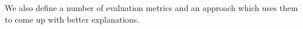 We also define a number of evaluation metrics and an approach which uses them to come up with better explanations.

%
%
%
%
%
%
%
